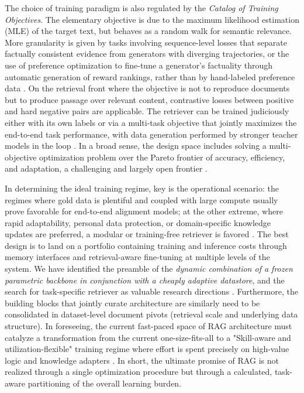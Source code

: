 \documentclass[11pt,a4paper]{article}
\begin{document}
The choice of training paradigm is also regulated by the \emph{Catalog of Training Objectives}. The elementary objective is due to the maximum likelihood estimation (MLE) of the target text, but behaves as a random walk for semantic relevance. More granularity is given by tasks involving sequence-level losses that separate factually consistent evidence from generators with diverging trajectories, or the use of preference optimization to fine-tune a generator's factuality through automatic generation of reward rankings, rather than by hand-labeled preference data \cite{arxiv:2311.08401v1}. On the retrieval front where the objective is not to reproduce documents but to produce passage over relevant content, contrastive losses between positive and hard negative pairs are applicable. The retriever can be trained judiciously either with its own labels or via a multi-task objective that jointly maximizes the end-to-end task performance, with data generation performed by stronger teacher models in the loop \cite{arxiv:2311.08401v1}. In a broad sense, the design space includes solving a multi-objective optimization problem over the Pareto frontier of accuracy, efficiency, and adaptation, a challenging and largely open frontier \cite{arxiv:2312.03863v3,arxiv:2404.19543v1}.

In determining the ideal training regime, key is the operational scenario: the regimes where gold data is plentiful and coupled with large compute usually prove favorable for end-to-end alignment models; at the other extreme, where rapid adaptability, personal data protection, or domain-specific knowledge updates are preferred, a modular or training-free retriever is favored \cite{arxiv:2312.05934v3}. The best design is to land on a portfolio containing training and inference costs through memory interfaces and retrieval-aware fine-tuning at multiple levels of the system. We have identified the preamble of the \emph{dynamic combination of a frozen parametric backbone in conjunction with a cheaply adaptive datastore}, and the search for task-specific retriever as valuable research directions \cite{arxiv:2312.05934v3}. Furthermore, the building blocks that jointly curate architecture are similarly need to be consolidated in dataset-level document pivots (retrieval scale and underlying data structure). In foreseeing, the current fast-paced space of RAG architecture must catalyze a transformation from the current one-size-fits-all to a "Skill-aware and utilization-flexible" training regime where effort is spent precisely on high-value logic and knowledge adapters \cite{arxiv:2312.05934v3}. In short, the ultimate promise of RAG is not realized through a single optimization procedure but through a calculated, task-aware partitioning of the overall learning burden.
\end{document}
